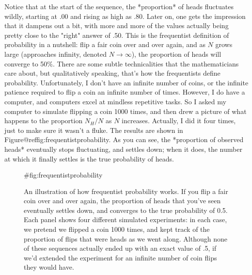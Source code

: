 Notice that at the start of the sequence, the *proportion* of heads fluctuates wildly, starting at .00 and rising as high as .80. Later on, one gets the impression that it dampens out a bit, with more and more of the values actually being pretty close to the "right" answer of .50. This is the frequentist definition of probability in a nutshell: flip a fair coin over and over again, and as $N$ grows large (approaches infinity, denoted $N\rightarrow \infty$), the proportion of heads will converge to 50\%. There are some subtle technicalities that the mathematicians care about, but qualitatively speaking, that's how the frequentists define probability. Unfortunately, I don't have an infinite number of coins, or the infinite patience required to flip a coin an infinite number of times. However, I do have a computer, and computers excel at mindless repetitive tasks. So I asked my computer to simulate flipping a coin 1000 times, and then drew a picture of what happens to the proportion $N_H / N$ as $N$ increases. Actually, I did it four times, just to make sure it wasn't a fluke. The results are shown in Figure@reffig:frequentistprobability. As you can see, the *proportion of observed heads* eventually stops fluctuating, and settles down; when it does, the number at which it finally settles is the true probability of heads.


\begin{figure}[p]
\begin{center}
\caption{An illustration of how frequentist probability works. If you flip a fair coin over and over again, the proportion of heads that you've seen eventually settles down, and converges to the true probability of 0.5. Each panel shows four different simulated experiments: in each case, we pretend we flipped a coin 1000 times, and kept track of the proportion of flips that were heads as we went along. Although none of these sequences actually ended up with an exact value of .5, if we'd extended the experiment for an infinite number of coin flips they would have.}
{#fig:frequentistprobability}
\HR
\end{center}
\end{figure}


